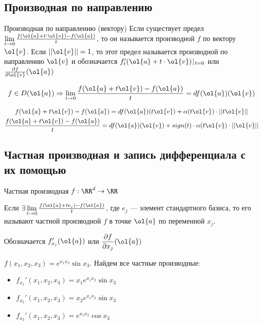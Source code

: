 \subsection{Производная по направлению}

\begin{defn}{Производная по направлению (вектору)}{}
    Если существует предел \( \lim\limits_{t \to 0} \frac{f(\ol{a} + t \cdot \ol{v}) - f(\ol{a})}{t} \),
    то он называется производной \( f \) по вектору \( \ol{v} \).
    Если \( ||\ol{v}|| = 1 \), то этот предел называется производной по направлению \( \ol{v} \)
    и обозначается \( f_t ' (\ol{a} + t \cdot \ol{v}) \: \vline_{\: t = 0} \)
    или \( \frac{\partial f}{\partial \ol{v}} (\ol{a}) \)
\end{defn}

\begin{thrm}{}{}
    \[
        f \in D(\ol{a}) \Rightarrow \lim\limits_{t \to 0} \frac{f(\ol{a} + t \ol{v}) - f(\ol{a})}{t} = df(\ol{a})(\ol{v})
    \]
\end{thrm}
\begin{gather*}
    f(\ol{a} + t \ol{v}) - f(\ol{a}) = df(\ol{a}) (t \ol{v}) + \alpha(t \ol{v}) \cdot || t \ol{v} ||
    \\
    \frac{f(\ol{a} + t \ol{v}) - f(\ol{a})}{t} = df(\ol{a}) (\ol{v}) + sign(t) \cdot \alpha(t \ol{v}) \cdot || \ol{v} ||
\end{gather*}

\subsection{Частная производная и запись дифференциала с их помощью}

\begin{defn}{Частная производная}{}
    \( f : \RR^d \to \RR \)

    Если \( \exists \lim\limits_{t \to 0} \frac{f(\ol{a} + t e_j)  - f(\ol{a})}{t} \),
    где \( e_j \) --- элемент стандартного базиса, то его называют частной производной \( f \) в точке \( \ol{a} \)
    по переменной \( x_j \).

    Обозначается \( f_{x_j}' (\ol{a}) \) или \( \displaystyle \frac{\partial f}{\partial x_j} (\ol{a}) \)
\end{defn}

\begin{example}{}{}
    \( f(x_1, x_2, x_3) = e^{x_1 x_2} \sin x_3 \). Найдем все частные производные:
    \begin{itemize}
        \item
            \( f_{x_1}' (x_1, x_2, x_3) = x_1 e^{x_1 x_2} \sin x_3 \)
        \item
            \( f_{x_2}' (x_1, x_2, x_3) = x_2 e^{x_1 x_2} \sin x_3 \)
        \item
            \( f_{x_3}' (x_1, x_2, x_3) = e^{x_1 x_2} \cos x_3 \)
    \end{itemize}
\end{example}

